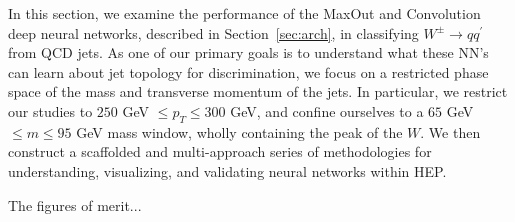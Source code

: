 
In this section, we examine the performance of the MaxOut and Convolution deep neural networks, described in Section~\ref{sec:arch}, in classifying $W^\pm \to q q^\prime$ from QCD jets.  As one of our primary goals is to understand  what these NN's can learn about jet topology for discrimination, we focus on a restricted phase space of the mass and transverse momentum of the jets.  In particular, we restrict our studies to $250$ GeV $\leq p_T \leq 300$ GeV, and confine ourselves to a $65$ GeV $\leq m \leq 95$ GeV mass window, wholly containing the peak of the $W$.   We then construct a scaffolded and multi-approach series of methodologies for understanding, visualizing, and validating neural networks within HEP.

The figures of merit...


